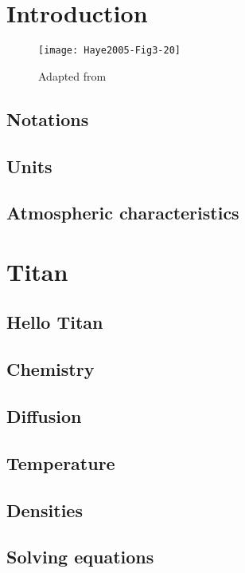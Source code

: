 \documentclass{report}
\begin{document}
\tableofcontents

\part{Introduction}
\begin{figure}
\centering
\texttt{[image: Haye2005-Fig3-20]}
\caption{Adapted from \cite{Haye2005}}
\end{figure}
\chapter{Notations}


\chapter{Units}


\chapter{Atmospheric characteristics}


\part{Titan}
\chapter{Hello Titan}


\chapter{Chemistry}


\chapter{Diffusion}


\chapter{Temperature}


\chapter{Densities}


\chapter{Solving equations}

\end{document}
